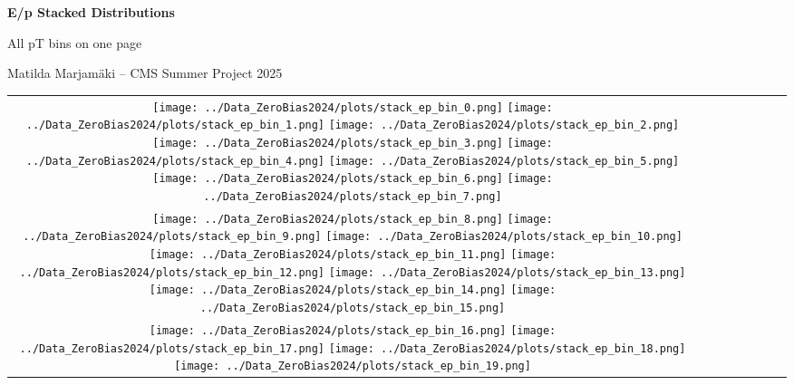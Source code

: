 \documentclass[a4paper,10pt]{article}
\begin{document}
\begin{center}
    \Huge \textbf{E/p Stacked Distributions}\par\vspace{1ex}
    \Large All pT bins on one page\par\vspace{1ex}
    \normalsize Matilda Marjamäki -- CMS Summer Project 2025
\end{center}
\vspace{0.6cm}
\begin{center}
\setlength{\tabcolsep}{2pt}
\renewcommand{\arraystretch}{1.0}
\begin{tabular}{cccccccc}
    \texttt{[image: ../Data\_ZeroBias2024/plots/stack\_ep\_bin\_0.png]} %
    \texttt{[image: ../Data\_ZeroBias2024/plots/stack\_ep\_bin\_1.png]} %
    \texttt{[image: ../Data\_ZeroBias2024/plots/stack\_ep\_bin\_2.png]} %
    \texttt{[image: ../Data\_ZeroBias2024/plots/stack\_ep\_bin\_3.png]} %
    \texttt{[image: ../Data\_ZeroBias2024/plots/stack\_ep\_bin\_4.png]} %
    \texttt{[image: ../Data\_ZeroBias2024/plots/stack\_ep\_bin\_5.png]} %
    \texttt{[image: ../Data\_ZeroBias2024/plots/stack\_ep\_bin\_6.png]} %
    \texttt{[image: ../Data\_ZeroBias2024/plots/stack\_ep\_bin\_7.png]} \\
    \texttt{[image: ../Data\_ZeroBias2024/plots/stack\_ep\_bin\_8.png]} %
    \texttt{[image: ../Data\_ZeroBias2024/plots/stack\_ep\_bin\_9.png]} %
    \texttt{[image: ../Data\_ZeroBias2024/plots/stack\_ep\_bin\_10.png]} %
    \texttt{[image: ../Data\_ZeroBias2024/plots/stack\_ep\_bin\_11.png]} %
    \texttt{[image: ../Data\_ZeroBias2024/plots/stack\_ep\_bin\_12.png]} %
    \texttt{[image: ../Data\_ZeroBias2024/plots/stack\_ep\_bin\_13.png]} %
    \texttt{[image: ../Data\_ZeroBias2024/plots/stack\_ep\_bin\_14.png]} %
    \texttt{[image: ../Data\_ZeroBias2024/plots/stack\_ep\_bin\_15.png]} \\
    \texttt{[image: ../Data\_ZeroBias2024/plots/stack\_ep\_bin\_16.png]} %
    \texttt{[image: ../Data\_ZeroBias2024/plots/stack\_ep\_bin\_17.png]} %
    \texttt{[image: ../Data\_ZeroBias2024/plots/stack\_ep\_bin\_18.png]} %
    \texttt{[image: ../Data\_ZeroBias2024/plots/stack\_ep\_bin\_19.png]} %

\end{tabular}
\end{center}
\end{document}
